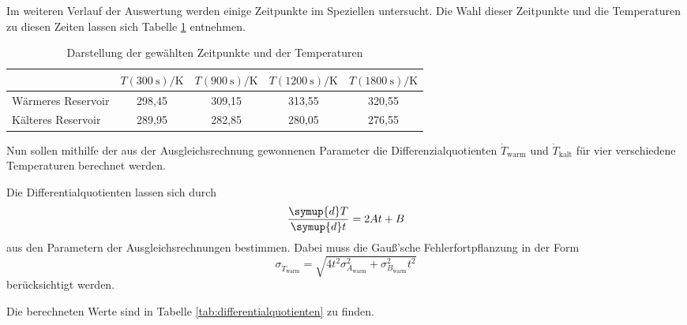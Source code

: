 
Im weiteren Verlauf der Auswertung werden einige Zeitpunkte im Speziellen untersucht.
Die Wahl dieser Zeitpunkte und die Temperaturen zu diesen Zeiten lassen sich Tabelle
\ref{tab:ausgewaehltemesswerte} entnehmen.

\begin{table}[h]
		\centering
    \caption{Darstellung der gewählten Zeitpunkte und der Temperaturen}
		\label{tab:ausgewaehltemesswerte}
		\begin{tabular}{lcccc}
			\toprule
			& $T(\SI{300}{\second}) / \text{K}$ & $T(\SI{900}{\second}) / \text{K}$ & $T(\SI{1200}{\second}) / \text{K}$ & $T(\SI{1800}{\second}) / \text{K}$\\
			\midrule
			Wärmeres Reservoir & 298,45 & 309,15 & 313,55 & 320,55 \\
			Kälteres Reservoir & 289,95 & 282,85 & 280,05 & 276,55 \\
			\bottomrule
		\end{tabular}
	\end{table}

Nun sollen mithilfe der aus der Ausgleichsrechnung gewonnenen Parameter die Differenzialquotienten
$\dot{T}_\text{warm}$ und $\dot{T}_\text{kalt}$ für vier verschiedene Temperaturen berechnet werden.

Die Differentialquotienten lassen sich durch
\begin{equation}
  \frac{\symup{d}T}{\symup{d}t}=2At+B
\end{equation}
aus den Parametern der Ausgleichsrechnungen bestimmen. Dabei muss die Gauß'sche
Fehlerfortpflanzung in der Form
\begin{equation}
  \sigma_{\dot{T}_\text{warm}} = \sqrt{4 t^2 \sigma_{A_\text{warm}}^{2} + \sigma_{B_\text{warm}}^{2} t^{2}}
\end{equation}
berücksichtigt werden.

Die berechneten Werte sind in Tabelle \ref{tab:differentialquotienten} zu finden.

